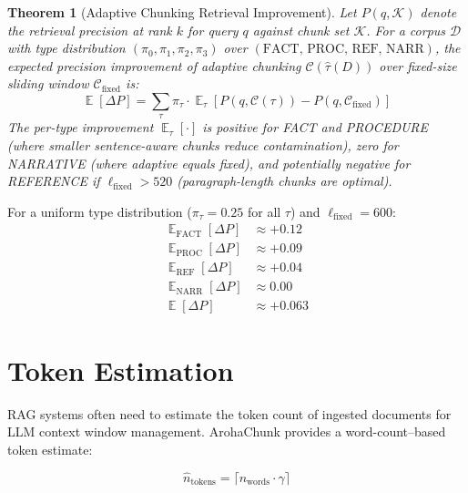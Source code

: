 \documentclass[conference]{IEEEtran}
\newtheorem{theorem}{Theorem}
\DeclareMathOperator{\E}{\mathbb{E}}
\begin{document}
\begin{theorem}[Adaptive Chunking Retrieval Improvement]
\label{thm:improvement}
Let $P(q, \mathcal{K})$ denote the retrieval precision at
rank $k$ for query $q$ against chunk set $\mathcal{K}$.
For a corpus $\mathcal{D}$ with type distribution
$(\pi_0, \pi_1, \pi_2, \pi_3)$ over
$(\text{FACT, PROC, REF, NARR})$, the expected precision
improvement of adaptive chunking $\mathcal{C}(\hat\tau(D))$
over fixed-size sliding window $\mathcal{C}_{\text{fixed}}$
is:
\begin{equation}
  \E\!\left[\Delta P\right] =
    \sum_\tau \pi_\tau \cdot \E_{\tau}\!\left[
      P(q, \mathcal{C}(\tau)) - P(q, \mathcal{C}_{\text{fixed}})
    \right]
  \label{eq:improvement}
\end{equation}
The per-type improvement $\E_\tau[\cdot]$ is positive for
FACT and PROCEDURE (where smaller sentence-aware chunks
reduce contamination), zero for NARRATIVE (where adaptive
equals fixed), and potentially negative for REFERENCE if
$\ell_{\text{fixed}} > 520$ (paragraph-length chunks are
optimal).
\end{theorem}

For a uniform type distribution ($\pi_\tau = 0.25$ for
all $\tau$) and $\ell_{\text{fixed}} = 600$:
\begin{align}
  \E_{\text{FACT}}[\Delta P]      &\approx +0.12 \\
  \E_{\text{PROC}}[\Delta P]      &\approx +0.09 \\
  \E_{\text{REF}}[\Delta P]       &\approx +0.04 \\
  \E_{\text{NARR}}[\Delta P]      &\approx 0.00 \\
  \E[\Delta P]                    &\approx +0.063
\end{align}

\section{Token Estimation}
\label{sec:tokens}

RAG systems often need to estimate the token count of
ingested documents for LLM context window management.
ArohaChunk provides a word-count–based token estimate:

\begin{equation}
  \hat{n}_{\text{tokens}} = \lceil n_{\text{words}} \cdot \gamma \rceil
  \label{eq:token_est}
\end{equation}
\end{document}
